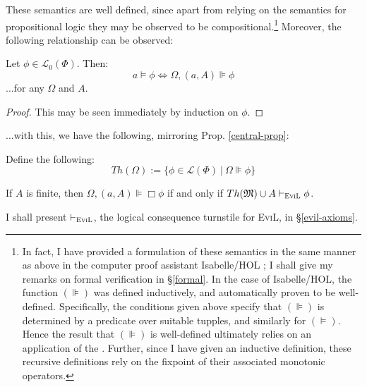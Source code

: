 These semantics are well defined, since apart from relying on the semantics
for propositional logic they may be observed to be compositional.{\footnote{In
fact, I have provided a formulation of these semantics in the same manner as
above in the computer proof assistant Isabelle/HOL \citep{nipkow_isabelle/hol:proof_2002}; I shall
give my remarks on formal verification in \S\ref{formal}.  In the case of
Isabelle/HOL, the function $(\VDash)$ was defined inductively, and
automatically proven to be well-defined.  Specifically, the conditions given
above specify that $(\VDash)$ is determined by a 
predicate over suitable tupples, and similarly for $(\models)$.  Hence the
result that $(\VDash)$ is well-defined ultimately relies on an application of
the  \citep[chapter 12]{roman_lattices_2008}. Further,
since I have given an inductive definition, these recursive definitions rely
on the {} fixpoint of their associated monotonic operators.}} 
Moreover, the following relationship can be observed:

\begin{lemma}
  Let $\phi \in \mathcal{L}_0 (\Phi)$.  Then:
  \[ a \models \phi \Longleftrightarrow \Omega, (a, A) \VDash \phi \]
  $\ldots$for any $\Omega$ and $A$.
\end{lemma}

\begin{proof}
  This may be seen immediately by induction on $\phi$.
\end{proof}

$\ldots$with this, we have the following, mirroring Prop. \ref{central-prop}:
 
\begin{definition}  Define the following:
 $$Th(\Omega) := \{ \phi \in \mathcal{L}(\Phi) \ |\ \Omega \VDash \phi \}$$
\end{definition}

\begin{theorem}\label{theorem-theorem}
  If $A$ is finite, then $\Omega, (a,A) \VDash \Box \phi$ if and only if $Th(\Omega) \cup A \vdash_{\text{\textsc{EviL}}} \phi$.
\end{theorem}

I shall present $\vdash_{\text{\textsc{EviL}}}$, the logical consequence turnstile for \textsc{EviL}, in \S\ref{evil-axioms}.

